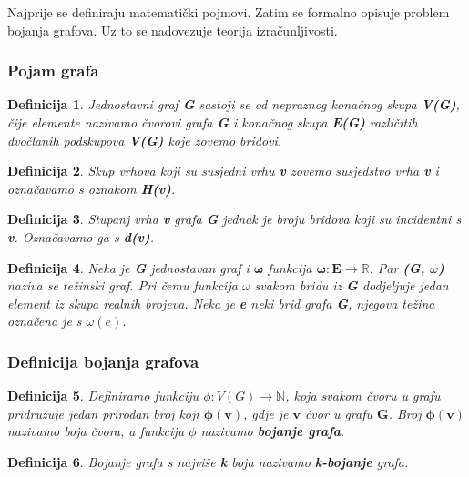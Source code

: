 \documentclass[times, utf8, diplomski, numeric]{fer}
\newtheorem{definition}{Definicija}
\begin{document}
Najprije se definiraju matematički pojmovi. Zatim se formalno opisuje problem bojanja grafova. Uz to se nadovezuje teorija izračunljivosti.

\subsubsection{Pojam grafa}

\begin{definition}
Jednostavni graf \textbf{G} sastoji se od nepraznog konačnog skupa \textbf{V(G)}, čije elemente nazivamo čvorovi grafa \textbf{G} i konačnog skupa \textbf{E(G)} različitih dvočlanih podskupova \textbf{V(G)} koje zovemo bridovi.
\end{definition}

\begin{definition}
Skup vrhova koji su susjedni vrhu \textbf{v} zovemo susjedstvo vrha \textbf{v} i označavamo s oznakom \textbf{H(v)}.
\end{definition}

\begin{definition}
Stupanj vrha \textbf{v} grafa \textbf{G} jednak je broju bridova koji su incidentni s \textbf{v}. Označavamo ga s \textbf{d(v)}.
\end{definition}

\begin{definition}
Neka je \textbf{G} jednostavan graf i $\mathbf{\omega}$ funkcija $\mathbf{\omega : E \rightarrow \mathbb{R}}$. Par \textbf{(G, $\omega$)} naziva se težinski graf. Pri čemu funkcija $\omega$ svakom bridu iz \textbf{G} dodjeljuje jedan element iz skupa realnih brojeva. Neka je \textbf{e} neki brid grafa \textbf{G}, njegova težina označena je s $\omega(\mathbf{\mathit{e}})$.	 
\end{definition}


\subsubsection{Definicija bojanja grafova}

\begin{definition}
Definiramo funkciju $\phi : V(G) \rightarrow \mathbb{N}$, koja svakom čvoru u grafu pridružuje jedan prirodan broj koji $\mathbf{\phi(v)}$, gdje je $\mathbf{v}$ čvor u grafu $\mathbf{G}$. Broj $\mathbf{\phi(v)}$ nazivamo boja čvora, a funkciju $\phi$ nazivamo \textbf{bojanje grafa}. 
\end{definition}

\begin{definition}
Bojanje grafa s najviše \textbf{k} boja nazivamo \textbf{k-bojanje} grafa. 
\end{definition}
\end{document}
